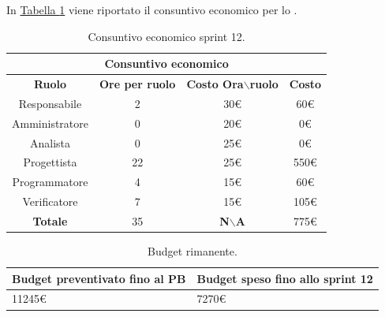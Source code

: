 In \hyperref[tab:sprint12_consuntivo_economico]{Tabella \ref{tab:sprint12_consuntivo_economico}} viene riportato il consuntivo economico per lo .
\begin{table}[H]
    \centering
    \begin{tabular}{|c|c|c|c|}
        \hline
            \multicolumn{4}{|c|}{\textbf{Consuntivo economico}} \\ 
        \hline
            \textbf{Ruolo} & \textbf{Ore per ruolo} & \textbf{Costo Ora$\backslash$ruolo} & \textbf{Costo} \\
        \hline
        Responsabile & 2 & 30€ & 60€ \\
        \hline
        Amministratore & 0 & 20€ & 0€ \\
        \hline
        Analista & 0 & 25€ & 0€ \\
        \hline
        Progettista & 22 & 25€ & 550€ \\
        \hline
        Programmatore & 4 & 15€ & 60€ \\
        \hline
        Verificatore & 7 & 15€ & 105€ \\
        \hline 
        \textbf{Totale} & 35 & \textbf{N$\backslash$A} & 775€  \\
        \hline
    \end{tabular}
    \caption{Consuntivo economico sprint 12.}
    \label{tab:sprint12_consuntivo_economico}
\end{table}

\begin{table}[H]
    \centering
    \begin{tabular}{| l | l |}
    \hline
    \textbf{Budget preventivato fino al PB} & \textbf{Budget speso fino allo sprint 12}\\
    \hline
        11245€ & 7270€ \\
    \hline
    \end{tabular}
    \caption{Budget rimanente.}
    \label{tab:budget_rimanente_sprint12}
\end{table}